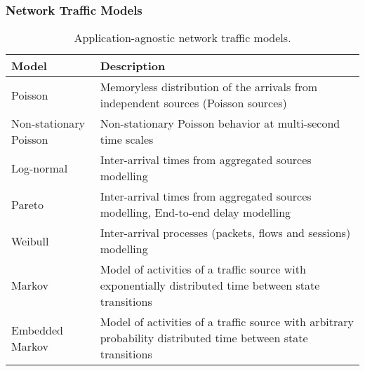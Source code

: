 \subsubsection{Network Traffic Models}
\label{sec:IEEECOMSTmodels}

\begin{table}[htp]
	\caption{Application-agnostic network traffic models.}
	\centering
	\label{tab:IEEECOMSTtrafficmodels}
	\def\arraystretch{1.2}%
	\setlength\tabcolsep{2.0pt} %
	{\scriptsize
		\begin{tabular}{>{\centering\arraybackslash}m{}
			>{\centering\arraybackslash}m{}
		}
		\toprule
		\textbf{Model} & \textbf{Description} \\
		\midrule
		\midrule
		Poisson \cite{Guerin2003} & Memoryless distribution of the arrivals from independent sources (Poisson sources) \\
		Non-stationary Poisson \cite{karagiannis2004} & Non-stationary Poisson behavior at multi-second time scales \\
		Log-normal \cite{Bhattacharjee2010} & Inter-arrival times from aggregated sources modelling \\
		Pareto \cite{Bhattacharjee2010, Zhang2007} & Inter-arrival times from aggregated sources modelling, End-to-end delay modelling \\
		Weibull \cite{Arfeen2013} & Inter-arrival processes (packets, flows and sessions) modelling \\
		Markov \cite{Adas1997} & Model of activities of a traffic source with exponentially distributed time between state transitions \\
		Embedded Markov \cite{Adas1997} & Model of activities of a traffic source with arbitrary probability distributed time between state transitions \\
		\bottomrule
		\bottomrule
	\end{tabular}
	}
\end{table}

